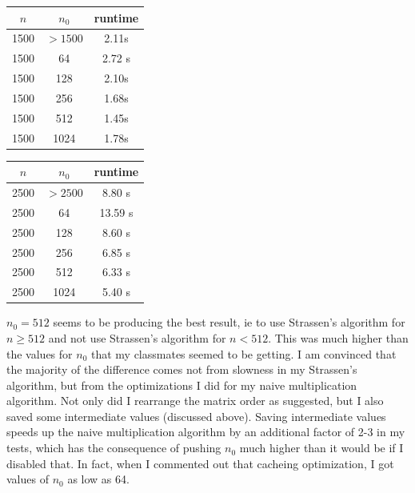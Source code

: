 \documentclass{article}
\begin{document}
\begin{center}
\begin{tabular} { |c|c|c| }
\hline
$n$ & $n_0$ & runtime \\
\hline\hline
1500 & $>1500$ & 2.11s \\
\hline\hline
1500 & 64 & 2.72 s \\
\hline
1500 & 128 & 2.10s \\
\hline
1500 & 256 & 1.68s\\
\hline
1500 & 512 & 1.45s \\ 
\hline
1500 & 1024 & 1.78s\\
\hline
\end{tabular}
\end{center}

\begin{center}
\begin{tabular} { |c|c|c| }
\hline
$n$ & $n_0$ & runtime \\
\hline\hline
2500 & $>2500$ & 8.80 s \\
\hline\hline
2500 & 64 &  13.59 s \\
\hline
2500 & 128 & 8.60 s \\
\hline
2500 & 256 &  6.85 s\\
\hline
2500 & 512 & 6.33 s \\ 
\hline
2500 & 1024 & 5.40 s\\
\hline
\end{tabular}
\end{center}

$n_0 = 512$ seems to be producing the best result, ie to use Strassen's algorithm for $n \geq 512$ and not use Strassen's algorithm for $n < 512$. This was much higher than the values for $n_0$ that my classmates seemed to be getting. I am convinced that the majority of the difference comes not from slowness in my Strassen's algorithm, but from the optimizations I did for my naive multiplication algorithm. Not only did I rearrange the matrix order as suggested, but I also saved some intermediate values (discussed above). Saving intermediate values speeds up the naive multiplication algorithm by an additional factor of 2-3 in my tests, which has the consequence of pushing $n_0$ much higher than it would be if I disabled that. In fact, when I commented out that cacheing optimization, I got values of $n_0$ as low as 64. 
\end{document}
